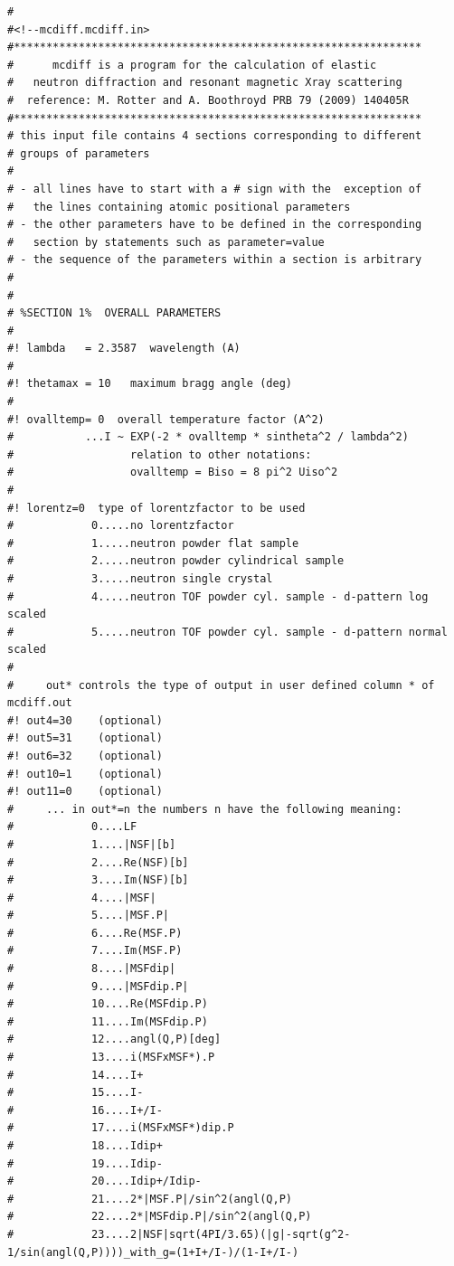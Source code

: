 {\footnotesize
\begin{verbatim}
#
#<!--mcdiff.mcdiff.in>
#***************************************************************
#      mcdiff is a program for the calculation of elastic
#   neutron diffraction and resonant magnetic Xray scattering 
#  reference: M. Rotter and A. Boothroyd PRB 79 (2009) 140405R
#*************************************************************** 
# this input file contains 4 sections corresponding to different
# groups of parameters
#
# - all lines have to start with a # sign with the  exception of 
#   the lines containing atomic positional parameters
# - the other parameters have to be defined in the corresponding 
#   section by statements such as parameter=value
# - the sequence of the parameters within a section is arbitrary
# 
#
# %SECTION 1%  OVERALL PARAMETERS
#
#! lambda   = 2.3587  wavelength (A)
#
#! thetamax = 10   maximum bragg angle (deg)
#
#! ovalltemp= 0  overall temperature factor (A^2) 
#           ...I ~ EXP(-2 * ovalltemp * sintheta^2 / lambda^2) 
#                  relation to other notations:
#                  ovalltemp = Biso = 8 pi^2 Uiso^2
#
#! lorentz=0  type of lorentzfactor to be used
#            0.....no lorentzfactor 
#            1.....neutron powder flat sample
#            2.....neutron powder cylindrical sample
#            3.....neutron single crystal
#            4.....neutron TOF powder cyl. sample - d-pattern log scaled
#            5.....neutron TOF powder cyl. sample - d-pattern normal scaled
#
#     out* controls the type of output in user defined column * of mcdiff.out
#! out4=30    (optional)
#! out5=31    (optional)
#! out6=32    (optional)
#! out10=1    (optional)
#! out11=0    (optional)
#     ... in out*=n the numbers n have the following meaning:
#            0....LF          
#            1....|NSF|[b]    
#            2....Re(NSF)[b]  
#            3....Im(NSF)[b]  
#            4....|MSF|       
#            5....|MSF.P|     
#            6....Re(MSF.P)   
#            7....Im(MSF.P)   
#            8....|MSFdip|    
#            9....|MSFdip.P|  
#            10....Re(MSFdip.P)
#            11....Im(MSFdip.P)
#            12....angl(Q,P)[deg]
#            13....i(MSFxMSF*).P
#            14....I+          
#            15....I-          
#            16....I+/I-       
#            17....i(MSFxMSF*)dip.P
#            18....Idip+       
#            19....Idip-       
#            20....Idip+/Idip- 
#            21....2*|MSF.P|/sin^2(angl(Q,P)
#            22....2*|MSFdip.P|/sin^2(angl(Q,P)
#            23....2|NSF|sqrt(4PI/3.65)(|g|-sqrt(g^2-1/sin(angl(Q,P))))_with_g=(1+I+/I-)/(1-I+/I-)

\end{verbatim}}
